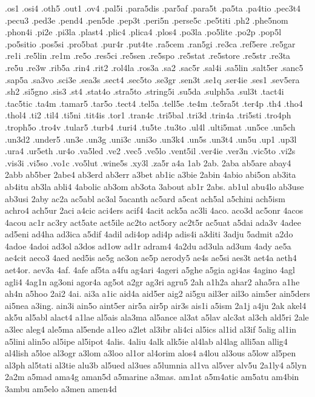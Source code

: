 {.os1
.osi4
.oth5
.out1
.ov4
.pal5i
.para5dis
.par5af
.para5t
.pa5ta
.pa4tio
.pec3t4
.pecu3
.ped3e
.pend4
.pen5de
.pep3t
.peri5n
.perse5c
.pe5titi
.ph2
.phe5nom
.phon4i
.pi2e
.pi3la
.plast4
.plic4
.plica4
.plos4
.po3la
.po5lite
.po2p
.pop5l
.po5sitio
.pos5si
.pro5bat
.pur4r
.put4te
.ra5cem
.ran5gi
.re3ca
.ref5ere
.re5gar
.re1i
.re5lin
.re1m
.re5o
.res5ci
.re5sen
.re5spo
.re5stat
.re5store
.re5str
.re3ta
.re5u
.re3w
.rib5a
.rin4
.rit2
.rol4la
.ros3a
.sa2
.sac5r
.sal4i
.sa5lin
.salt5er
.sanc5
.sap5a
.sa3vo
.sci3e
.sea3s
.sect4
.sec5to
.se3gr
.sen3t
.se1q
.ser4ie
.ses1
.sev5era
.sh2
.si5gno
.sis3
.st4
.stat4o
.stra5to
.string5i
.su5da
.sulph5a
.sul3t
.tact4i
.tac5tic
.ta4m
.tamar5
.tar5o
.tect4
.tel5a
.tell5e
.te4m
.te5ra5t
.ter4p
.th4
.tho4
.thol4
.ti2
.til4
.ti5ni
.tit4is
.tor1
.tran4c
.tri5bal
.tri3d
.trin4a
.tri5sti
.tro4ph
.troph5o
.tro4v
.tular5
.turb4
.turi4
.tu5te
.tu3to
.ul4l
.ulti5mat
.un5ce
.un5ch
.un3d2
.under5
.un3e
.un3g
.uni3c
.uni3o
.un3k4
.un5s
.un3t4
.un5u
.up1
.up3l
.ura4
.ur5eth
.ur4o
.va5led
.ve2
.vec5
.ve5lo
.vent5il
.ver4ie
.ver3n
.vic5to
.vi2s
.vis3i
.vi5so
.vo1c
.vo5lut
.wine5s
.xy3l
.za5r
a4a
1ab
2ab.
2aba
ab5are
abay4
2abb
ab5ber
2abe4
ab3erd
ab3err
a3bet
ab1ic
a3bie
2abin
4abio
abi5on
ab3ita
ab4itu
ab3la
abli4
4abolic
ab3om
ab3ota
3about
ab1r
2abs.
ab1ul
abu4lo
ab3use
ab3usi
2aby
ac2a
ac5abl
ac3al
5acanth
ac5ard
a5cat
ach5al
a5chini
ach5ism
achro4
ach5ur
2aci
a4cic
aci4ers
acif4
4acit
ack5a
ac3li
4aco.
aco3d
ac5onr
4acos
4acou
ac1r
ac3ry
act5ate
act5ile
ac2to
act5ory
ac2t5r
ac5uat
a5dai
ada3v
4adee
ad5eni
ad4ha
ad3ica
a5dif
4adil
adi4op
adi4p
adis4i
a3diti
3adju
5admit
a2do
4adoe
4adoi
ad3ol
a3dos
ad1ow
ad1r
adram4
4a2du
ad3ula
ad3um
4ady
ae5a
ae4cit
aeco3
4aed
aed5is
ae5g
ae3on
ae5p
aerody5
ae4s
ae5si
aes3t
aet4a
aeth4
aet4or.
aev3a
4af.
4afe
af5ta
a4fu
ag4ari
4ageri
a5ghe
a5gia
agi4as
4agino
4agl
agli4
4ag1n
ag3oni
agor4a
ag5ot
a2gr
ag3ri
agru5
2ah
a1h2a
ahar2
aha5ra
a1he
ah4n
a5hoo
2ai2
4ai.
ai3a
a1ic
aid4a
aid5er
aig2
ai5gu
ail3er
ail3o
aim5er
ain5ders
ai5nea
a3ing.
ain3i
ain5o
aint5er
air5a
air5p
air3s
ais1i
a5ism
2a1j
a4ju
2ak
akel4
ak5u
al5abl
alact4
a1lae
al5ais
ala3ma
al5ance
al3at
a5lav
alc3at
al3ch
ald5ri
2ale
a3lec
aleg4
ale5ma
al5ende
a1leo
a2let
al3ibr
ali4ci
al5ics
al1id
al3if
5alig
al1in
a5lini
alin5o
al5ipe
al5ipot
4alis.
4aliu
4alk
alk5ie
al4lab
al4lag
alli5an
allig4
al4lish
a5loe
al3ogr
a3lom
a3loo
al1or
al4orim
alos4
a4lou
al3ous
a5low
al5pen
al3ph
al5tati
al3tie
alu3b
al5ued
al3ues
a5lumnia
al1va
al5ver
alv5u
2a1ly4
a5lyn
2a2m
a5mad
ama4g
aman5d
a5marine
a3mas.
am1at
a5m4atic
am5atu
am4bin
3ambu
am5elo
a3men
amen4d
}
